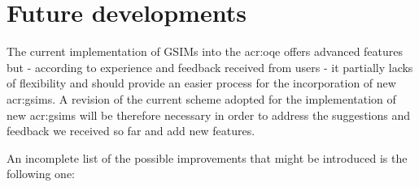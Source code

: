 %
\section{Future developments}
%
The current implementation of GSIMs into the \gls{acr:oqe} offers advanced
features but - according to experience and feedback received
from users - it partially lacks of flexibility and should provide
an easier process for the incorporation of new \glspl{acr:gsim}. 
%
A revision of the current scheme adopted for the implementation of new 
\glspl{acr:gsim} will be therefore necessary in order to 
address the suggestions and feedback we received so far and add new features.
 
An incomplete list of the possible improvements that might be introduced 
is the following one:
%

